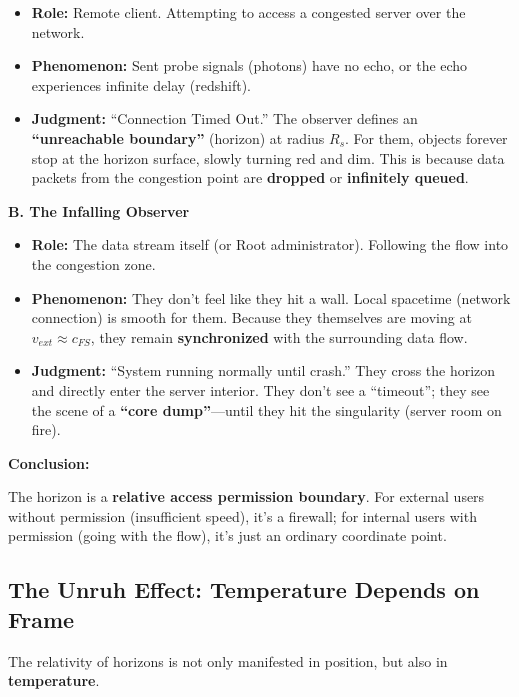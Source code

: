 \begin{itemize}
\item \textbf{Role:} Remote client. Attempting to access a congested server over the network.

\item \textbf{Phenomenon:} Sent probe signals (photons) have no echo, or the echo experiences infinite delay (redshift).

\item \textbf{Judgment:} ``Connection Timed Out.'' The observer defines an \textbf{``unreachable boundary''} (horizon) at radius \textbf{$R_s$}. For them, objects forever stop at the horizon surface, slowly turning red and dim. This is because data packets from the congestion point are \textbf{dropped} or \textbf{infinitely queued}.
\end{itemize}

\textbf{B. The Infalling Observer}

\begin{itemize}
\item \textbf{Role:} The data stream itself (or Root administrator). Following the flow into the congestion zone.

\item \textbf{Phenomenon:} They don't feel like they hit a wall. Local spacetime (network connection) is smooth for them. Because they themselves are moving at \textbf{$v_{ext} \approx c_{FS}$}, they remain \textbf{synchronized} with the surrounding data flow.

\item \textbf{Judgment:} ``System running normally until crash.'' They cross the horizon and directly enter the server interior. They don't see a ``timeout''; they see the scene of a \textbf{``core dump''}---until they hit the singularity (server room on fire).
\end{itemize}

\textbf{Conclusion:}

The horizon is a \textbf{relative access permission boundary}. For external users without permission (insufficient speed), it's a firewall; for internal users with permission (going with the flow), it's just an ordinary coordinate point.

\subsection{The Unruh Effect: Temperature Depends on Frame}

The relativity of horizons is not only manifested in position, but also in \textbf{temperature}.

